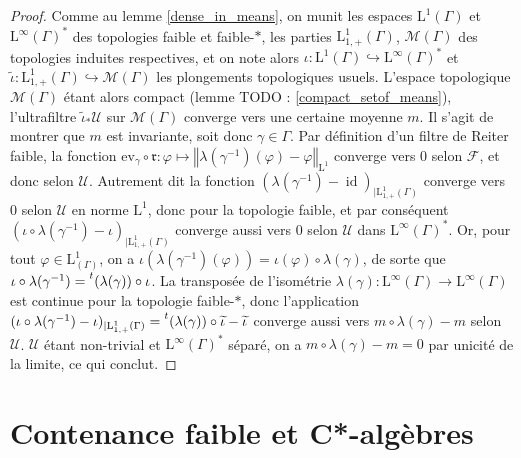 \documentclass[a4paper,12pt]{article}
\newcommand{\ev}{\mathrm{ev}}
\newcommand{\norm}[1]{\left\Vert #1\right\Vert}
\newcommand{\transpose}[1]{\prescript{t}{}{#1}{}{}}
\newcommand{\inv}{^{-1}}
\newcommand{\comp}{\circ}
\newcommand{\TODO}[1]{{\color{red}TODO :} #1}
\DeclareMathOperator{\id}{id}
\begin{document}
\begin{proof}
    Comme au lemme \ref{dense_in_means}, on munit les espaces $\mathrm{L}^1(\Gamma)$ et $\mathrm{L}^\infty(\Gamma)^*$ des topologies faible et faible-$*$,
    les parties $\mathrm{L}^1_{1, +}(\Gamma)$, $\mathcal{M}(\Gamma)$ des topologies induites respectives, et on note alors
    $\iota:\mathrm{L}^1(\Gamma)\hookrightarrow\mathrm{L}^\infty(\Gamma)^*$ et $\widetilde{\iota}:\mathrm{L}^1_{1, +}(\Gamma)\hookrightarrow \mathcal{M}(\Gamma)$
    les plongements topologiques usuels. L'espace topologique $\mathcal{M}(\Gamma)$ étant alors compact (lemme \TODO{\ref{compact_setof_means}}),
    l'ultrafiltre $\widetilde{\iota}_*\mathscr{U}$ sur $\mathcal{M}(\Gamma)$ converge vers une certaine moyenne $m$. Il s'agit de montrer que $m$ est invariante,
    soit donc $\gamma\in\Gamma$. Par définition d'un filtre de Reiter faible, la fonction $\ev_\gamma\comp\mathfrak{r}:\varphi\mapsto\norm{\lambda(\gamma\inv)(\varphi)-\varphi}_{\mathrm{L}^1}$
    converge vers $0$ selon $\mathscr{F}$, et donc selon $\mathscr{U}$. Autrement dit la 
    fonction $(\lambda(\gamma\inv)-\id)_{|\mathrm{L}^1_{1, +}(\Gamma)}$ converge vers $0$ selon $\mathscr{U}$
    en norme $\mathrm{L}^1$, donc pour la topologie faible, et par conséquent $(\iota\comp\lambda(\gamma\inv)-\iota)_{|\mathrm{L}^1_{1, +}(\Gamma)}$ converge 
    aussi vers $0$ selon $\mathscr{U}$ dans $\mathrm{L}^\infty(\Gamma)^*$. Or, pour tout
    $\varphi\in\mathrm{L}^1_(\Gamma)$, on a $\iota(\lambda(\gamma\inv)(\varphi))=\iota(\varphi)\comp\lambda(\gamma)$, de sorte que 
    $\iota\comp\lambda(\gamma\inv) = \transpose{(\lambda(\gamma))}\comp\iota$.
    La transposée de l'isométrie $\lambda(\gamma):\mathrm{L}^\infty(\Gamma)\to\mathrm{L}^\infty(\Gamma)$ est continue 
    pour la topologie faible-$*$, donc l'application $(\iota\comp\lambda(\gamma\inv)-\iota)_{|\mathrm{L}^1_{1, +}(\Gamma)} = \transpose{(\lambda(\gamma))}\comp\widetilde{\iota} - \widetilde{\iota}$
    converge aussi vers $m\comp\lambda(\gamma)-m$ selon $\mathscr{U}$.
    $\mathscr{U}$ étant non-trivial et $\mathrm{L}^\infty(\Gamma)^*$ séparé, on a $m\comp\lambda(\gamma)-m = 0$ par unicité de la limite, ce qui conclut.
\end{proof}

\section{Contenance faible et C*-algèbres}
\end{document}
